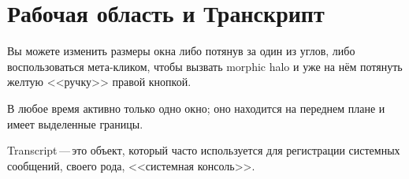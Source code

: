 \documentclass[a4paper,10pt,twoside]{book}
\begin{document}

\section{Рабочая область и Транскрипт}




Вы можете изменить размеры окна  либо потянув за один из углов,
либо воспользоваться  мета-кликом, чтобы вызвать morphic halo
и уже на нём потянуть  желтую <<ручку>> правой кнопкой. 


В любое время активно только одно окно; оно находится
на переднем плане и имеет выделенные границы. 



Transcript\,---\,это объект, который часто используется для регистрации
системных сообщений, своего рода, <<системная консоль>>. 
\end{document}
